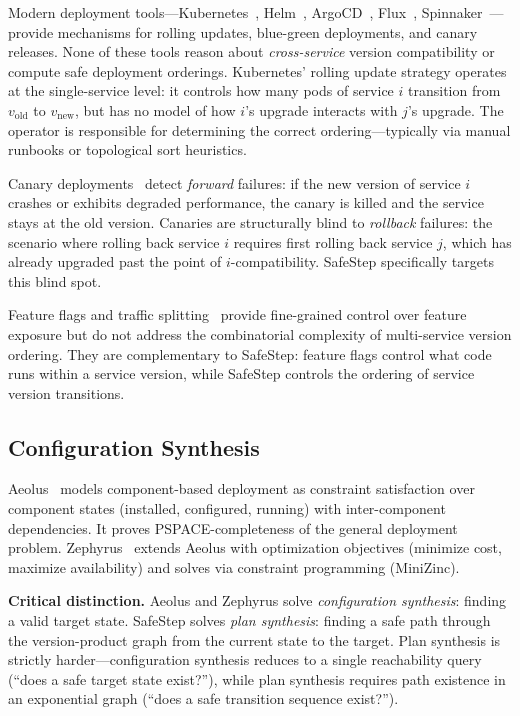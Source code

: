 \documentclass[10pt,twocolumn]{article}
\begin{document}
Modern deployment tools---Kubernetes~\cite{burns2016borg}, Helm~\cite{helm}, ArgoCD~\cite{argocd}, Flux~\cite{flux}, Spinnaker~\cite{spinnaker}---provide mechanisms for rolling updates, blue-green deployments, and canary releases. None of these tools reason about \emph{cross-service} version compatibility or compute safe deployment orderings. Kubernetes' rolling update strategy operates at the single-service level: it controls how many pods of service $i$ transition from $v_{\mathrm{old}}$ to $v_{\mathrm{new}}$, but has no model of how $i$'s upgrade interacts with $j$'s upgrade. The operator is responsible for determining the correct ordering---typically via manual runbooks or topological sort heuristics.

Canary deployments~\cite{schermann2018continuous} detect \emph{forward} failures: if the new version of service $i$ crashes or exhibits degraded performance, the canary is killed and the service stays at the old version. Canaries are structurally blind to \emph{rollback} failures: the scenario where rolling back service $i$ requires first rolling back service $j$, which has already upgraded past the point of $i$-compatibility. SafeStep specifically targets this blind spot.

Feature flags and traffic splitting~\cite{tang2015holistic} provide fine-grained control over feature exposure but do not address the combinatorial complexity of multi-service version ordering. They are complementary to SafeStep: feature flags control what code runs within a service version, while SafeStep controls the ordering of service version transitions.

\subsection{Configuration Synthesis}
\label{sec:related-config}

Aeolus~\cite{dicosmo2014aeolus} models component-based deployment as constraint satisfaction over component states (installed, configured, running) with inter-component dependencies. It proves PSPACE-completeness of the general deployment problem. Zephyrus~\cite{becker2015zephyrus} extends Aeolus with optimization objectives (minimize cost, maximize availability) and solves via constraint programming (MiniZinc).

\textbf{Critical distinction.} Aeolus and Zephyrus solve \emph{configuration synthesis}: finding a valid target state. SafeStep solves \emph{plan synthesis}: finding a safe path through the version-product graph from the current state to the target. Plan synthesis is strictly harder---configuration synthesis reduces to a single reachability query (``does a safe target state exist?''), while plan synthesis requires path existence in an exponential graph (``does a safe transition sequence exist?'').
\end{document}
